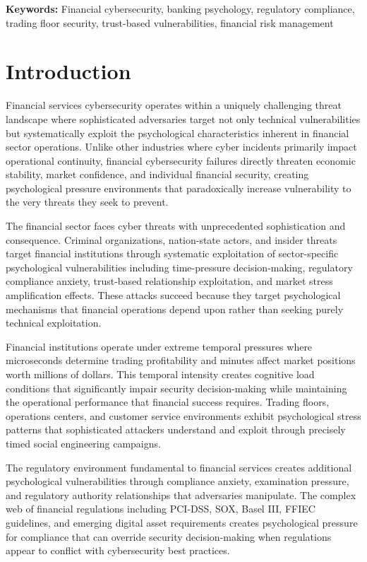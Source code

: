 \documentclass[10pt, twocolumn]{article}
\begin{document}
\textbf{Keywords:} Financial cybersecurity, banking psychology, regulatory compliance, trading floor security, trust-based vulnerabilities, financial risk management

\section{Introduction}

Financial services cybersecurity operates within a uniquely challenging threat landscape where sophisticated adversaries target not only technical vulnerabilities but systematically exploit the psychological characteristics inherent in financial sector operations. Unlike other industries where cyber incidents primarily impact operational continuity, financial cybersecurity failures directly threaten economic stability, market confidence, and individual financial security, creating psychological pressure environments that paradoxically increase vulnerability to the very threats they seek to prevent.

The financial sector faces cyber threats with unprecedented sophistication and consequence. Criminal organizations, nation-state actors, and insider threats target financial institutions through systematic exploitation of sector-specific psychological vulnerabilities including time-pressure decision-making, regulatory compliance anxiety, trust-based relationship exploitation, and market stress amplification effects. These attacks succeed because they target psychological mechanisms that financial operations depend upon rather than seeking purely technical exploitation.

Financial institutions operate under extreme temporal pressures where microseconds determine trading profitability and minutes affect market positions worth millions of dollars. This temporal intensity creates cognitive load conditions that significantly impair security decision-making while maintaining the operational performance that financial success requires. Trading floors, operations centers, and customer service environments exhibit psychological stress patterns that sophisticated attackers understand and exploit through precisely timed social engineering campaigns.

The regulatory environment fundamental to financial services creates additional psychological vulnerabilities through compliance anxiety, examination pressure, and regulatory authority relationships that adversaries manipulate. The complex web of financial regulations including PCI-DSS, SOX, Basel III, FFIEC guidelines, and emerging digital asset requirements creates psychological pressure for compliance that can override security decision-making when regulations appear to conflict with cybersecurity best practices.
\end{document}
